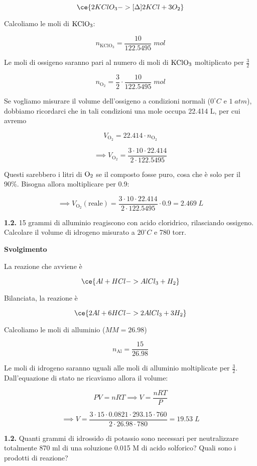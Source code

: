 $$\ce{2KClO_3 ->[{\Delta}] 2KCl + 3O_2}$$

Calcoliamo le moli di $\rm KClO_3$:

$$n_{\text{KClO}_3}=\frac{10}{122.5495}\;mol$$

Le moli di ossigeno saranno pari al numero di moli di $\rm KClO_3$ moltiplicato per $\frac{3}{2}$

$$n_{\text{O}_2}=\frac{3}{2}\cdot\frac{10}{122.5495}\;mol$$

Se vogliamo misurare il volume dell'ossigeno a condizioni normali ($0^{\circ}C$ e $1\;atm$), dobbiamo ricordarci che in tali condizioni una mole occupa 22.414 L, per cui avremo

$$V_{\text{O}_2}=22.414 \cdot n_{\text{O}_2}$$

$$\implies V_{\text{O}_2}=\frac{3 \cdot 10 \cdot 22.414}{2 \cdot 122.5495}$$

Questi sarebbero i litri di $\rm O_2$ se il composto fosse puro, cosa che è solo per il 90\%. Bisogna allora moltiplicare per 0.9:

$$\implies V_{\text{O}_2}(\text{reale})
=\frac{3 \cdot 10 \cdot 22.414}{2 \cdot 122.5495}\cdot 0.9=2.469\;L$$

\textbf{1.2.} 15 grammi di alluminio reagiscono con acido cloridrico, rilasciando ossigeno. Calcolare il volume di idrogeno misurato a $20^{\circ}C$ e 780 torr.

\vspace{0.2cm}\large\textbf{Svolgimento}\normalsize

\vspace{0.2cm}La reazione che avviene è

$$\ce{Al + HCl -> AlCl_3 + H_2}$$

Bilanciata, la reazione è

$$\ce{2Al + 6HCl -> 2AlCl_3 + 3H_2}$$

Calcoliamo le moli di alluminio ($MM=26.98$)

$$n_{\text{Al}}=\frac{15}{26.98}$$

Le moli di idrogeno saranno uguali alle moli di alluminio moltiplicate per $\frac{3}{2}$. Dall'equazione di stato ne ricaviamo allora il volume:

$$PV=nRT \implies V=\frac{nRT}{P}$$

$$\implies V=\frac{3 \cdot 15 \cdot 0.0821 \cdot 293.15 \cdot 760}{2 \cdot 26.98 \cdot 780}=19.53\;L$$

\textbf{1.2.} Quanti grammi di idrossido di potassio sono necessari per neutralizzare totalmente 870 ml di una soluzione 0.015 M di acido solforico? Quali sono i prodotti di reazione?


